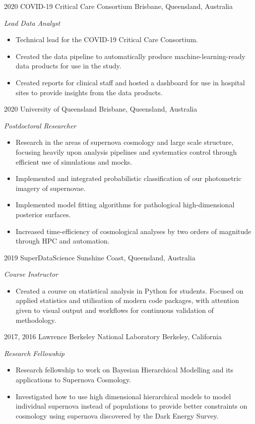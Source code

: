 \begin{entrylist}

\entry
{2020}
{COVID-19 Critical Care Consortium}
{Brisbane, Queensland, Australia}
{\emph{Lead Data Analyst}
\begin{itemize}
	\item Technical lead for the COVID-19 Critical Care Consortium.
	\item Created the data pipeline to automatically produce machine-learning-ready data products for use in the study.
	\item Created reports for clinical staff and hosted a dashboard for use in hospital sites to provide insights from the data products.
\end{itemize}
}

\entry
{2020}
{University of Queensland}
{Brisbane, Queensland, Australia}
{\emph{Postdoctoral Researcher}
\begin{itemize}
\item Research in the areas of supernova cosmology and large scale structure, focusing heavily upon analysis pipelines and
systematics control through efficient use of simulations and mocks.
\item Implemented and integrated probabilistic classification of our photometric imagery of supernovae.
\item Implemented model fitting algorithms for pathological high-dimensional posterior surfaces.
\item Increased time-efficiency of cosmological analyses by two orders of magnitude through HPC and automation.
\end{itemize}
}
\end{entrylist}
\begin{entrylist}
\entry
{2019}
{SuperDataScience}
{Sunshine Coast, Queensland, Australia}
{\emph{Course Instructor}
\begin{itemize}
\item Created a course on statistical analysis in Python for students.
Focused on applied statistics and utilisation of modern code packages,
with attention given to visual output and workflows for continuous validation of methodology.
\end{itemize}
}
\end{entrylist}
\begin{entrylist}
\entry
{2017, 2016}
{Lawrence Berkeley National Laboratory}
{Berkeley, California}
{\emph{Research Fellowship}
\begin{itemize}
\item	Research fellowship to work on Bayesian Hierarchical Modelling and its applications to Supernova Cosmology.
\item	Investigated how to use high dimensional hierarchical models to model individual supernova instead of populations to provide better constraints on cosmology using supernova discovered by the Dark Energy Survey.
\end{itemize}}
\end{entrylist}
